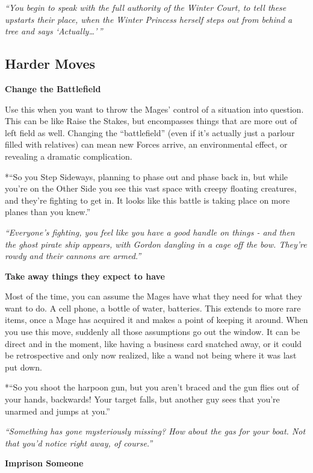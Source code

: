 \documentclass[
  oneside,
  statementpaper,
  9pt]{memoir}
\begin{document}
\emph{``You begin to speak with the full authority of the Winter Court,
to tell these upstarts their place, when the Winter Princess herself
steps out from behind a tree and says `Actually\ldots{}'\,''}

\hypertarget{harder-moves}{%
\subsection{Harder Moves}\label{harder-moves}}

\textbf{Change the Battlefield}

Use this when you want to throw the Mages' control of a situation into
question. This can be like Raise the Stakes, but encompasses things that
are more out of left field as well. Changing the ``battlefield'' (even
if it's actually just a parlour filled with relatives) can mean new
Forces arrive, an environmental effect, or revealing a dramatic
complication.

*``So you Step Sideways, planning to phase out and phase back in, but
while you're on the Other Side you see this vast space with creepy
floating creatures, and they're fighting to get in. It looks like this
battle is taking place on more planes than you knew.''

\emph{``Everyone's fighting, you feel like you have a good handle on
things - and then the ghost pirate ship appears, with Gordon dangling in
a cage off the bow. They're rowdy and their cannons are armed.''}

\textbf{Take away things they expect to have}

Most of the time, you can assume the Mages have what they need for what
they want to do. A cell phone, a bottle of water, batteries. This
extends to more rare items, once a Mage has acquired it and makes a
point of keeping it around. When you use this move, suddenly all those
assumptions go out the window. It can be direct and in the moment, like
having a business card snatched away, or it could be retrospective and
only now realized, like a wand not being where it was last put down.

*``So you shoot the harpoon gun, but you aren't braced and the gun flies
out of your hands, backwards! Your target falls, but another guy sees
that you're unarmed and jumps at you.''

\emph{``Something has gone mysteriously missing? How about the gas for
your boat. Not that you'd notice right away, of course.''}

\textbf{Imprison Someone}
\end{document}
